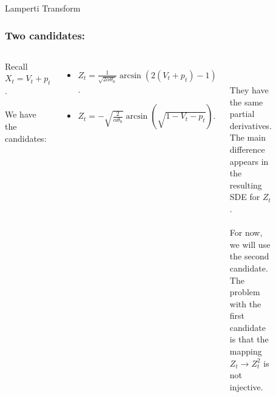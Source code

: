 \documentclass[aspectratio=169]{beamer}\usepackage[utf8]{inputenc}
\begin{document}
\begin{frame}

{\Huge Lamperti Transform}

\end{frame}


\begin{frame}\frametitle{Two candidates:}

\begin{columns}

Recall $X_t=V_t+p_t$.\\
\quad\\
We have the candidates:
\begin{itemize}

\item {\color{blue} $Z_t=\frac{1}{\sqrt{2\alpha\theta_0}}\arcsin(2(V_t+p_t)-1)$.}
\item {\color{red} $Z_t=-\sqrt{\frac{2}{\alpha\theta_0}}\arcsin(\sqrt{1-V_t-p_t})$.}

\end{itemize}
\quad\\
\quad\\
They have the same partial derivatives. The main difference appears in the resulting SDE for $Z_t$.\\
\quad\\
For now, we will use the {\color{red}second candidate}. The problem with the {\color{blue} first candidate} is that the mapping $Z_t\to Z_t^2$ is not injective.

\begin{figure}[ht!]
\centering
\includegraphics[width=0.9\textwidth]{../../Mathematica_Files/new_model/Lamp_Comp.pdf}
\end{figure}

\end{columns}

\end{frame}
\end{document}
